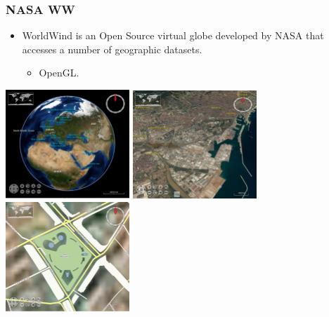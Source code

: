 \documentclass[hyperref={pdfpagelabels=true}]{beamer}
\begin{document}
\begin{frame}
\frametitle{NASA WW}
    \begin{itemize}
      \item<1->WorldWind is an Open Source virtual globe developed by NASA that accesses a number of geographic datasets.%
      \begin{itemize}
	  \item<1->OpenGL.%
       \end{itemize}
      \end{itemize}
	\includegraphics[width=0.35\textwidth]{ww1.png}
	\includegraphics[width=0.35\textwidth]{ww2.png}
	\includegraphics[width=0.35\textwidth]{ww3.png}	
\end{frame}
\end{document}
